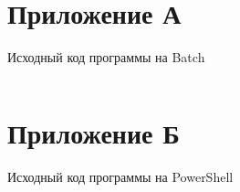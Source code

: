 \documentclass[a4paper, 14pt]{extarticle}
\newenvironment{code}{\captionsetup{type=listing}}{}
\begin{document}
\newpage

\section*{Приложение А}

\begin{code}
  \caption{Исходный код программы на Batch}
  \label{code:cmd}
  \inputminted{batch}{../code/interface-config.cmd}
\end{code}

\newpage

\section*{Приложение Б}

\begin{code}
  \caption{Исходный код программы на PowerShell}
  \label{code:ps1}
  \inputminted{powershell}{../code/interface-config.ps1}
\end{code}
\end{document}
